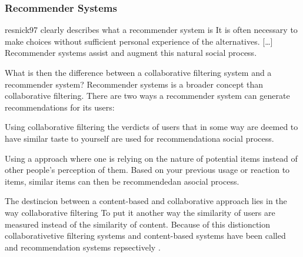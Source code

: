 \subsubsection{Recommender Systems}
\label{section:background.social.navigation.applied.forms.recommendations}

\begin{fullquote}[\p{56}]{resnick97}{%
  clearly describes what a recommender system is}
  It is often necessary to make choices without sufficient
  personal experience of the alternatives.
  [\ldots]
  Recommender systems assist and augment this
  natural social process.
\end{fullquote}

What is then the difference between a collaborative
filtering system and a recommender system?
Recommender systems is a broader concept than collaborative
filtering. There are two ways a recommender system can generate
recommendations for its users:

\begin{enum}
  \item Using collaborative filtering
    the verdicts of users that in some way are deemed to have similar
    taste to yourself are used for recommendation\dash{}a social process.
  \item Using a  approach where one is relying on the
    nature of potential items instead of other people's perception of them.
    Based on your previous usage or reaction to items, similar items can then
    be recommended\dash{}an asocial process.
\end{enum}

The destincion between a content-based and collaborative approach lies in
the way collaborative filtering  To put it another
way the similarity of users are measured instead of the similarity of content.
Because of this distionction collaborativetive filtering systems
and content-based systems have been called  and
 recommendation systems repsectively
\citep[]{greco04}.

